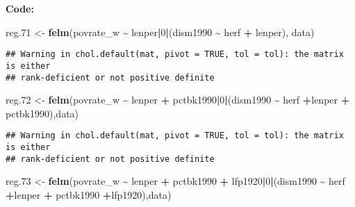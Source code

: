 \documentclass[
]{article}
\newenvironment{Shaded}{\begin{snugshade}}{\end{snugshade}}
\newcommand{\DecValTok}[1]{\textcolor[rgb]{0.00,0.00,0.81}{#1}}
\newcommand{\FloatTok}[1]{\textcolor[rgb]{0.00,0.00,0.81}{#1}}
\newcommand{\FunctionTok}[1]{\textcolor[rgb]{0.13,0.29,0.53}{\textbf{#1}}}
\newcommand{\NormalTok}[1]{#1}
\newcommand{\OtherTok}[1]{\textcolor[rgb]{0.56,0.35,0.01}{#1}}
\newcommand{\SpecialCharTok}[1]{\textcolor[rgb]{0.81,0.36,0.00}{\textbf{#1}}}
\begin{document}
\textbf{Code:}

\begin{Shaded}
\begin{Highlighting}[]
\NormalTok{reg}\FloatTok{.71} \OtherTok{\textless{}{-}} \FunctionTok{felm}\NormalTok{(povrate\_w }\SpecialCharTok{\textasciitilde{}}\NormalTok{ lenper}\SpecialCharTok{|}\DecValTok{0}\SpecialCharTok{|}\NormalTok{(dism1990 }\SpecialCharTok{\textasciitilde{}}\NormalTok{ herf }\SpecialCharTok{+}\NormalTok{ lenper), data)}
\end{Highlighting}
\end{Shaded}

\begin{verbatim}
## Warning in chol.default(mat, pivot = TRUE, tol = tol): the matrix is either
## rank-deficient or not positive definite
\end{verbatim}

\begin{Shaded}
\begin{Highlighting}[]
\NormalTok{reg}\FloatTok{.72} \OtherTok{\textless{}{-}} \FunctionTok{felm}\NormalTok{(povrate\_w }\SpecialCharTok{\textasciitilde{}}\NormalTok{ lenper }\SpecialCharTok{+}\NormalTok{ pctbk1990}\SpecialCharTok{|}\DecValTok{0}\SpecialCharTok{|}\NormalTok{(dism1990 }\SpecialCharTok{\textasciitilde{}}\NormalTok{ herf }\SpecialCharTok{+}\NormalTok{lenper }\SpecialCharTok{+}\NormalTok{ pctbk1990),data)}
\end{Highlighting}
\end{Shaded}

\begin{verbatim}
## Warning in chol.default(mat, pivot = TRUE, tol = tol): the matrix is either
## rank-deficient or not positive definite
\end{verbatim}

\begin{Shaded}
\begin{Highlighting}[]
\NormalTok{reg}\FloatTok{.73} \OtherTok{\textless{}{-}} \FunctionTok{felm}\NormalTok{(povrate\_w }\SpecialCharTok{\textasciitilde{}}\NormalTok{ lenper }\SpecialCharTok{+}\NormalTok{ pctbk1990 }\SpecialCharTok{+}\NormalTok{ lfp1920}\SpecialCharTok{|}\DecValTok{0}\SpecialCharTok{|}\NormalTok{(dism1990 }\SpecialCharTok{\textasciitilde{}}\NormalTok{ herf }\SpecialCharTok{+}\NormalTok{lenper }\SpecialCharTok{+}\NormalTok{ pctbk1990 }\SpecialCharTok{+}\NormalTok{lfp1920),data)}
\end{Highlighting}
\end{Shaded}
\end{document}
